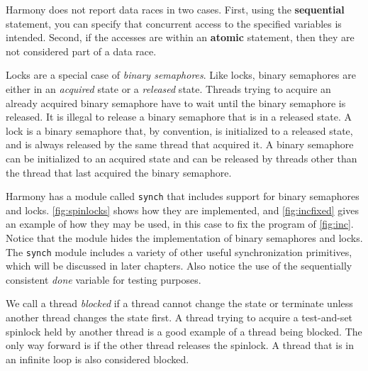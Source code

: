 \documentclass{report}
\begin{document}
Harmony does not report data races in two cases.
First, using the \textbf{sequential} statement, you can specify that
concurrent access to the specified variables is intended.
Second, if the accesses are within an \textbf{atomic} statement, then they
are not considered part of a data race.

Locks are a special case of \emph{binary semaphores}.
Like locks, binary semaphores are either in an \emph{acquired} state
or a \emph{released} state.
Threads trying to acquire an already acquired binary semaphore
have to wait until the binary semaphore is released.
It is illegal to release a binary semaphore that is in a released
state.
A lock is a binary semaphore that, by convention, is initialized to a
released state, and is always released by the same thread that acquired it.
A binary semaphore can be initialized to an acquired state and can be
released by threads other than the thread that last acquired the
binary semaphore.

Harmony has a module called \texttt{synch} that includes support for
binary semaphores and locks.
\autoref{fig:spinlocks} shows how they are implemented, and
\autoref{fig:incfixed} gives an example of how they may be used,
in this case to fix the program of \autoref{fig:inc}.
Notice that the module hides the implementation of
binary semaphores and locks.
The \texttt{synch} module includes a variety of other useful
synchronization primitives, which will be discussed in later
chapters.
Also notice the use of the sequentially consistent \textit{done}
variable for testing purposes.

%

We call a thread \emph{blocked}
%
if a thread cannot change the state or terminate unless
another thread changes the state first.
A thread trying to
acquire a test-and-set spinlock held by another thread is a good example
of a thread being blocked.
The only way forward is if the other thread releases the spinlock.
A thread that is in an infinite loop is also considered blocked.
\end{document}
